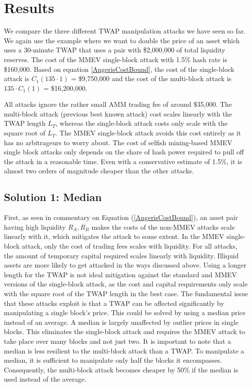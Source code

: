 \section{Results}
We compare the three different TWAP manipulation attacks we have seen so far. We again use the example where we want to double the price of an asset which uses a 30-minute TWAP that uses a pair with \$2,000,000 of total liquidity reserves. The cost of the MMEV single-block attack with 1.5\% hash rate is \$160,000. Based on equation \ref{AngerisCostBound}, the cost of the single-block attack is $C_1(135 \cdot 1)$ = \$9,750,000 and the cost of the multi-block attack is $135 \cdot C_1(1)$ = \$16,200,000.
 
All attacks ignore the rather small AMM trading fee of around \$35,000. The multi-block attack (previous best known attack) cost scales linearly with the TWAP length $L_T$, whereas the single-block attack costs only scale with the square root of $L_T$. The MMEV single-block attack avoids this cost entirely as it has no arbitrageurs to worry about. The cost of selfish mining-based MMEV single block attacks only depends on the share of hash power required to pull off the attack in a reasonable time. Even with a conservative estimate of 1.5\%, it is almost two orders of magnitude cheaper than the other attacks.

\subsection{Solution 1: Median \label{sectionPotentialSolution}}
First, as seen in commentary on Equation (\ref{AngerisCostBound}), an asset pair having high liquidity $R_A, R_B$ makes the costs of the non-MMEV attacks scale linearly with it, which mitigates the attack to some extent. In the MMEV single-block attack, only the cost of trading fees scales with liquidity. For all attacks, the amount of temporary capital required scales linearly with liquidity. Illiquid assets are more likely to get attacked in the ways discussed above. Using a longer length for the TWAP is not ideal mitigation against the standard and MMEV versions of the single-block attack, as the cost and capital requirements only scale with the square root of the TWAP length in the best case. The fundamental issue that these attacks exploit is that a TWAP can be affected significantly by manipulating a single block's price. This could be solved by using a median price instead of an average. A median is largely unaffected by outlier prices in single blocks. This eliminates the single-block attack and requires the MMEV attack to take place over many blocks and not just two. It is important to note that a median is less resilient to the multi-block attack than a TWAP. To manipulate a median, it is sufficient to manipulate only half the blocks it encompasses. Consequently, the multi-block attack becomes cheaper by 50\% if the median is used instead of the average.

